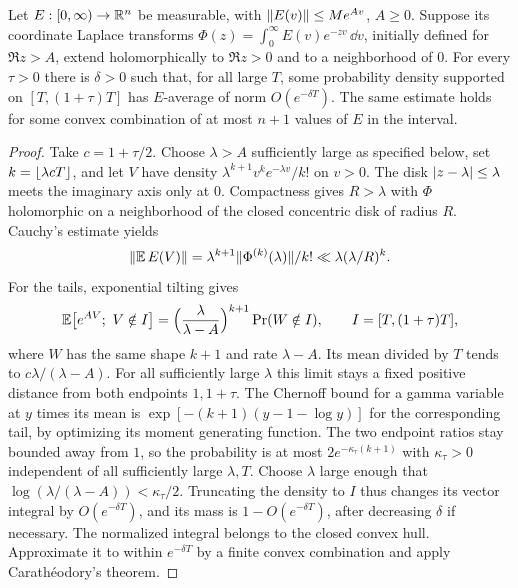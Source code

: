\begin{lemma}\label{zer:lem:laplace}
Let $E:[0,\infty)\to\mathbb{R}^n$ be measurable, with $\lVert E(v)\rVert\le Me^{Av}$, $A\ge0$. Suppose
its coordinate Laplace transforms $\Phi(z)=\int_0^\infty E(v)e^{-zv}\,\dd v$, initially
defined for $\Re z>A$, extend holomorphically to $\Re z>0$ and to a neighborhood of $0$.
For every $\tau>0$ there is $\delta>0$ such that, for all large $T$, some probability
density supported on $[T,(1+\tau)T]$ has $E$-average of norm $O(e^{-\delta T})$. The same
estimate holds for some convex combination of at most $n+1$ values of $E$ in the interval.
\end{lemma}
\begin{proof}
Take $c=1+\tau/2$. Choose $\lambda>A$ sufficiently large as specified below, set
$k=\lfloor\lambda cT\rfloor$, and let $V$ have density $\lambda^{k+1}v^ke^{-\lambda v}/k!$ on
$v>0$. The disk $\lvert z-\lambda\rvert\le\lambda$ meets the imaginary axis only at $0$.
Compactness gives $R>\lambda$ with $\Phi$ holomorphic on a neighborhood of the closed
concentric disk of radius $R$. Cauchy's estimate yields
\[
 \lVert\mathbb E\,E(V)\rVert=\lambda^{k+1}\lVert\Phi^{(k)}(\lambda)\rVert/k!\ll\lambda(\lambda/R)^k .
\]
For the tails, exponential tilting gives
\[
 \mathbb E\bigl[e^{AV};\ V\notin I\bigr]=\Bigl(\frac\lambda{\lambda-A}\Bigr)^{k+1}
 \Pr(W\notin I),\qquad I=[T,(1+\tau)T],
\]
where $W$ has the same shape $k+1$ and rate $\lambda-A$. Its mean divided by $T$ tends to
$c\lambda/(\lambda-A)$. For all sufficiently large $\lambda$ this limit stays a fixed
positive distance from both endpoints $1,1+\tau$. The Chernoff bound for a gamma variable
at $y$ times its mean is $\exp[-(k+1)(y-1-\log y)]$ for the corresponding tail, by
optimizing its moment generating function. The two endpoint ratios stay bounded away from
$1$, so the probability is at most $2e^{-\kappa_\tau(k+1)}$ with $\kappa_\tau>0$
independent of all sufficiently large $\lambda,T$. Choose $\lambda$ large enough that
$\log(\lambda/(\lambda-A))<\kappa_\tau/2$. Truncating the density to $I$ thus changes its
vector integral by $O(e^{-\delta T})$, and its mass is $1-O(e^{-\delta T})$, after
decreasing $\delta$ if necessary. The normalized integral belongs to the closed convex
hull. Approximate it to within $e^{-\delta T}$ by a finite convex combination and apply
Carath\'eodory's theorem.
\end{proof}


